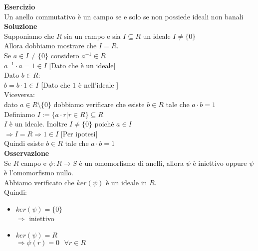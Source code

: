 \documentclass[12px]{article}
\begin{document}
\textbf{Esercizio}\\
Un anello commutativo è un campo se e solo se non possiede ideali non banali\\
\textbf{Soluzione}\\
Supponiamo che $R$ sia un campo e sia $I\subseteq R$ un ideale  $I\neq \{0\}$\\
Allora dobbiamo mostrare che  $I = R$.\\
Se  $a\in I\neq\{0\}$ considero  $a^{-1}\in R$\\
$a^{-1}\cdot a = 1\in I$ \hfill [Dato che è un ideale]\\
Dato  $b\in R:$\\
$b = b\cdot 1\in I$ \hfill [Dato che $1$ è nell'ideale ]\\
Viceversa:\\
dato $a\in R\setminus\{0\}$ dobbiamo verificare che esiste  $b\in R$ tale che  $a\cdot b = 1$ \\
Definiamo $I := \{ a\cdot r | r\in R\}\subseteq R$\\
$I$ è un ideale.
Inoltre $I \neq \{0\}$ poiché $a\in I$\\
$ \Rightarrow  I = R \Rightarrow 1\in I$ \hfill [Per ipotesi]\\
Quindi esiste $b\in R$  tale che $a\cdot b = 1$\\
 \textbf{Osservazione}\\
 Se $R$ campo e $\psi: R \rightarrow S$  è un omomorfismo di anelli, allora $\psi$ è iniettivo oppure $\psi $ è l'omomorfismo nullo.\\
 Abbiamo verificato che $ker(\psi)$ è un ideale in $R$.\\
 Quindi:
 \begin{itemize}
	 \item $ker(\psi) = \{0\}$\\
		  $ \Rightarrow $ iniettivo
	  \item $ker (\psi) = R$\\
		   $ \Rightarrow \psi(r) = 0 \ \ \ \forall r\in R$
 \end{itemize}
\end{document}
